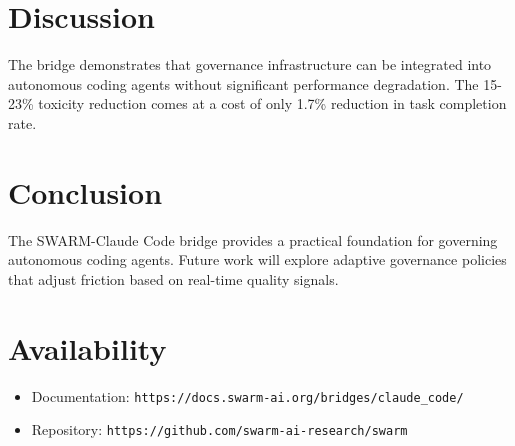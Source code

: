\documentclass{article}
\begin{document}
\section{Discussion}

The bridge demonstrates that governance infrastructure can be integrated into autonomous coding agents without significant performance degradation. The 15-23\% toxicity reduction comes at a cost of only 1.7\% reduction in task completion rate.

\section{Conclusion}

The SWARM-Claude Code bridge provides a practical foundation for governing autonomous coding agents. Future work will explore adaptive governance policies that adjust friction based on real-time quality signals.

\section{Availability}

\begin{itemize}
\item Documentation: \texttt{https://docs.swarm-ai.org/bridges/claude\_code/}
\item Repository: \texttt{https://github.com/swarm-ai-research/swarm}
\end{itemize}
\end{document}
